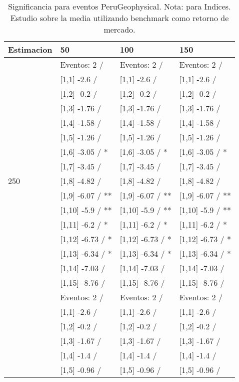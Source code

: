 \begin{table}

\caption{Significancia para eventos PeruGeophysical. Nota: para Indices. Estudio sobre la media utilizando benchmark como retorno de mercado.}
\centering
\begin{tabular}[t]{llll}
\toprule
Estimacion & 50 & 100 & 150\\
\midrule
 & Eventos:  2 / & Eventos:  2 / & Eventos:  2 /\\
 & {}[1,1] -2.6  / & {}[1,1] -2.6  / & {}[1,1] -2.6  /\\
 & {}[1,2] -0.2  / & {}[1,2] -0.2  / & {}[1,2] -0.2  /\\
 & {}[1,3] -1.76  / & {}[1,3] -1.76  / & {}[1,3] -1.76  /\\
 & {}[1,4] -1.58  / & {}[1,4] -1.58  / & {}[1,4] -1.58  /\\
\addlinespace
 & {}[1,5] -1.26  / & {}[1,5] -1.26  / & {}[1,5] -1.26  /\\
 & {}[1,6] -3.05  / * & {}[1,6] -3.05  / * & {}[1,6] -3.05  / *\\
 & {}[1,7] -3.45  / & {}[1,7] -3.45  / & {}[1,7] -3.45  /\\
250 & {}[1,8] -4.82  / & {}[1,8] -4.82  / & {}[1,8] -4.82  /\\
 & {}[1,9] -6.07  / ** & {}[1,9] -6.07  / ** & {}[1,9] -6.07  / **\\
\addlinespace
 & {}[1,10] -5.9  / ** & {}[1,10] -5.9  / ** & {}[1,10] -5.9  / **\\
 & {}[1,11] -6.2  / * & {}[1,11] -6.2  / * & {}[1,11] -6.2  / *\\
 & {}[1,12] -6.73  / * & {}[1,12] -6.73  / * & {}[1,12] -6.73  / *\\
 & {}[1,13] -6.34  / * & {}[1,13] -6.34  / * & {}[1,13] -6.34  / *\\
 & {}[1,14] -7.03  / & {}[1,14] -7.03  / & {}[1,14] -7.03  /\\
\addlinespace
 & {}[1,15] -8.76  / & {}[1,15] -8.76  / & {}[1,15] -8.76  /\\
 & Eventos:  2 / & Eventos:  2 / & Eventos:  2 /\\
 & {}[1,1] -2.6  / & {}[1,1] -2.6  / & {}[1,1] -2.6  /\\
 & {}[1,2] -0.2  / & {}[1,2] -0.2  / & {}[1,2] -0.2  /\\
 & {}[1,3] -1.67  / & {}[1,3] -1.67  / & {}[1,3] -1.67  /\\
\addlinespace
 & {}[1,4] -1.4  / & {}[1,4] -1.4  / & {}[1,4] -1.4  /\\
 & {}[1,5] -0.96  / & {}[1,5] -0.96  / & {}[1,5] -0.96  /\\

\end{tabular}
\end{table}
